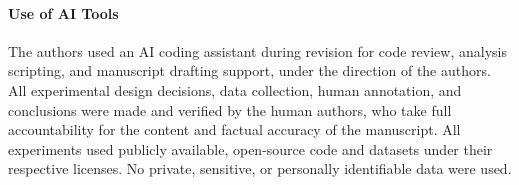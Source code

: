 \documentclass[pdflatex,sn-mathphys-ay]{sn-jnl}%
\theoremstyle{thmstyleone}%
\theoremstyle{thmstyletwo}%
\theoremstyle{thmstylethree}%
\begin{document}
\paragraph{Use of AI Tools}
{\color{blue}
The authors used an AI coding assistant during revision for code review, analysis scripting, and manuscript drafting support, under the direction of the authors. All experimental design decisions, data collection, human annotation, and conclusions were made and verified by the human authors, who take full accountability for the content and factual accuracy of the manuscript. All experiments used publicly available, open-source code and datasets under their respective licenses. No private, sensitive, or personally identifiable data were used.
}




\appendix
\end{document}
